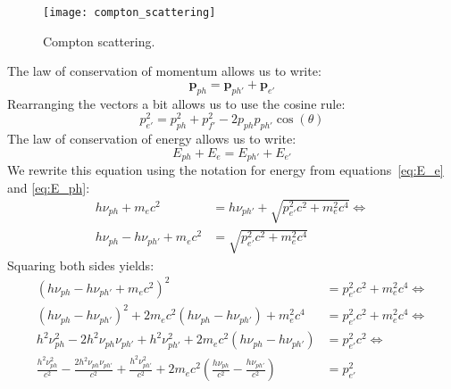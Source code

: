 \begin{figure}
    \centering
    \texttt{[image: compton\_scattering]}
    \caption{Compton scattering.}\label{fig:coll}
\end{figure}

The law of conservation of momentum allows us to write:
\begin{equation}
\textbf{p}_{ph} = \textbf{p}_{ph'} + \textbf{p}_{e'}
\end{equation}
Rearranging the vectors a bit allows us to use the cosine rule:
\begin{equation}
p^2_{e'} = p^2_{ph} + p^2_{f'} - 2p_{ph}p_{ph'}\cos(\theta) \label{eq:en_final}
\end{equation}
The law of conservation of energy allows us to write:
\begin{equation}
E_{ph} +E_e = E_{ph'} + E_{e'}
\end{equation}
We rewrite this equation using the notation for energy from equations~\ref{eq:E_e} and \ref{eq:E_ph}:
\begin{align}
h \nu_{ph} + m_e c^2 &= h \nu_{ph'} + \sqrt{p^2_{e'}c^2 + m^2_e c^4} \Longleftrightarrow\\
h \nu_{ph} - h \nu_{ph'} + m_e c^2 &= \sqrt{p^2_{e'}c^2 + m^2_e c^4}
\end{align}
Squaring both sides yields:
\begin{align}
\left( h \nu_{ph} - h \nu_{ph'} + m_e c^2 \right)^2 &= p^2_{e'}c^2 + m^2_e c^4 \Longleftrightarrow\\
\left( h \nu_{ph} - h \nu_{ph'} \right)^2 + 2m_e c^2 \left( h \nu_{ph} - h \nu_{ph'}\right) + m^2_e c^4 &= p^2_{e'}c^2 + m^2_e c^4 \Longleftrightarrow\\
h^2\nu^2_{ph} - 2h^2\nu_{ph}\nu_{ph'} + h^2\nu^2_{ph'} + 2m_ec^2 \left( h\nu_{ph} - h\nu_{ph'} \right) &= p^2_{e'}c^2 \Longleftrightarrow\\
\frac{h^2\nu^2_{ph}}{c^2} - \frac{2h^2\nu_{ph}\nu_{ph'}}{c^2} + \frac{h^2\nu^2_{ph'}}{c^2}+ 2m_ec^2 \left(  \frac{h\nu_{ph}}{c^2} - \frac{h\nu_{ph'}}{c^2} \right) &= p^2_{e'} \label{eq:mom_final}
\end{align}

